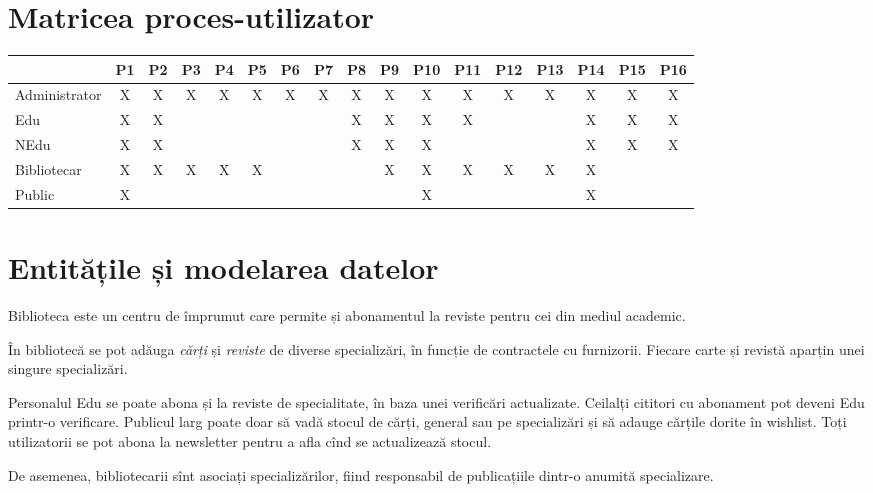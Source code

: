 
\section{Matricea proces-utilizator}
\label{sec:matrice-pu}

\begin{center}
  \small
  \begin{tabular}{|l|c|c|c|c|c|c|c|c|c|c|c|c|c|c|c|c|}
    \hline
    & P1 & P2 & P3 & P4 & P5 & P6 & P7 & P8 & P9 & P10 & P11 & P12 & P13 & P14 & P15 & P16 \\
    \hline \hline
    Administrator & X & X & X & X & X & X & X & X & X & X & X & X & X & X & X & X \\
    \hline
    Edu & X & X & & & & & & X & X & X & X & & & X & X & X \\
    \hline
    NEdu & X & X & & & & & & X & X & X & & & & X & X & X \\
    \hline
    Bibliotecar & X & X & X & X & X & & & & X & X & X & X & X & X & & \\
    \hline
    Public & X & & & & & & & & & X & & & & X & & \\
    \hline
  \end{tabular}
\end{center}


\section{Entitățile și modelarea datelor}
\label{sec:ent-model}

Biblioteca este un centru de împrumut care permite și abonamentul la reviste
pentru cei din mediul academic.

În bibliotecă se pot adăuga \emph{cărți} și \emph{reviste} de diverse
specializări, în funcție de contractele cu furnizorii. Fiecare
carte și revistă aparțin unei singure specializări.

Personalul Edu se poate abona și la reviste de specialitate, în baza
unei verificări actualizate. Ceilalți cititori cu abonament pot deveni
Edu printr-o verificare. Publicul larg poate doar să vadă stocul
de cărți, general sau pe specializări și să adauge cărțile dorite
în wishlist. Toți utilizatorii se pot abona la newsletter pentru a
afla cînd se actualizează stocul.

De asemenea, bibliotecarii sînt asociați specializărilor, fiind
responsabil de publicațiile dintr-o anumită specializare.


